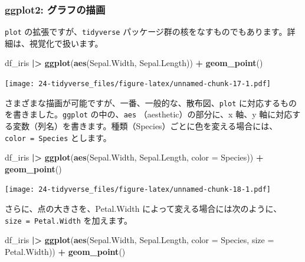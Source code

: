 \documentclass[
  xelatex, ja=standard]{bxjsbook}
\newenvironment{Shaded}{\begin{snugshade}}{\end{snugshade}}
\newcommand{\AttributeTok}[1]{\textcolor[rgb]{0.13,0.29,0.53}{#1}}
\newcommand{\FunctionTok}[1]{\textcolor[rgb]{0.13,0.29,0.53}{\textbf{#1}}}
\newcommand{\NormalTok}[1]{#1}
\newcommand{\SpecialCharTok}[1]{\textcolor[rgb]{0.81,0.36,0.00}{\textbf{#1}}}
\theoremstyle{definition}
\theoremstyle{definition}
\theoremstyle{definition}
\theoremstyle{definition}
\theoremstyle{remark}
\begin{document}
\hypertarget{ggplot2-ux30b0ux30e9ux30d5ux306eux63cfux753b}{%
\subsubsection{ggplot2: グラフの描画}\label{ggplot2-ux30b0ux30e9ux30d5ux306eux63cfux753b}}

\texttt{plot} の拡張ですが、\texttt{tidyverse} パッケージ群の核をなすものでもあります。詳細は、視覚化で扱います。

\begin{Shaded}
\begin{Highlighting}[]
\NormalTok{df\_iris }\SpecialCharTok{|\textgreater{}} \FunctionTok{ggplot}\NormalTok{(}\FunctionTok{aes}\NormalTok{(Sepal.Width, Sepal.Length)) }\SpecialCharTok{+} \FunctionTok{geom\_point}\NormalTok{()}
\end{Highlighting}
\end{Shaded}

\texttt{[image: 24-tidyverse\_files/figure-latex/unnamed-chunk-17-1.pdf]}

さまざまな描画が可能ですが、一番、一般的な、散布図、\texttt{plot} に対応するものを書きました。\texttt{ggplot} の中の、\texttt{aes} （aesthetic）の部分に、x 軸、y 軸に対応する変数（列名）を書きます。種類（Species）ごとに色を変える場合には、\texttt{color\ =\ Species} とします。

\begin{Shaded}
\begin{Highlighting}[]
\NormalTok{df\_iris }\SpecialCharTok{|\textgreater{}} \FunctionTok{ggplot}\NormalTok{(}\FunctionTok{aes}\NormalTok{(Sepal.Width, Sepal.Length, }\AttributeTok{color =}\NormalTok{ Species)) }\SpecialCharTok{+}
  \FunctionTok{geom\_point}\NormalTok{()}
\end{Highlighting}
\end{Shaded}

\texttt{[image: 24-tidyverse\_files/figure-latex/unnamed-chunk-18-1.pdf]}

さらに、点の大きさを、Petal.Width によって変える場合には次のように、\texttt{size\ =\ Petal.Width} を加えます。

\begin{Shaded}
\begin{Highlighting}[]
\NormalTok{df\_iris }\SpecialCharTok{|\textgreater{}} 
  \FunctionTok{ggplot}\NormalTok{(}\FunctionTok{aes}\NormalTok{(Sepal.Width, Sepal.Length, }\AttributeTok{color =}\NormalTok{ Species, }
             \AttributeTok{size =}\NormalTok{ Petal.Width)) }\SpecialCharTok{+}
  \FunctionTok{geom\_point}\NormalTok{()}
\end{Highlighting}
\end{Shaded}
\end{document}
